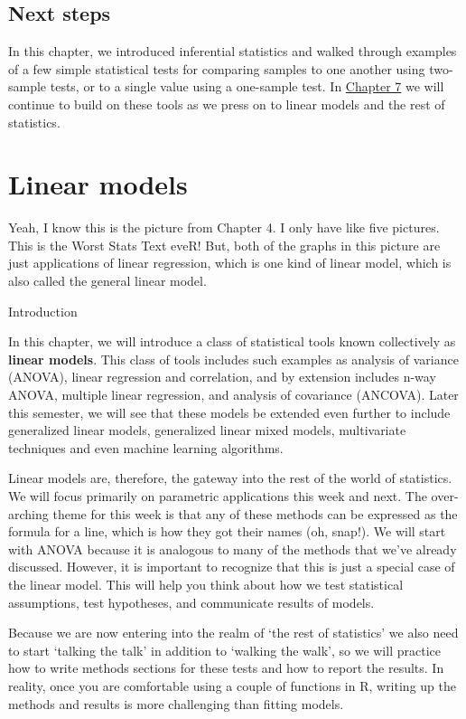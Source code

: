 \documentclass[
]{book}
\begin{document}
\hypertarget{next6}{%
\section{Next steps}\label{next6}}

In this chapter, we introduced inferential statistics and walked through examples of a few simple statistical tests for comparing samples to one another using two-sample tests, or to a single value using a one-sample test. In \protect\hyperlink{Chapter7}{Chapter 7} we will continue to build on these tools as we press on to linear models and the rest of statistics.

\hypertarget{Chapter7}{%
\chapter{Linear models}\label{Chapter7}}

Yeah, I know this is the picture from Chapter 4. I only have like five pictures. This is the Worst Stats Text eveR! But, both of the graphs in this picture are just applications of linear regression, which is one kind of linear model, which is also called the general linear model.

Introduction

In this chapter, we will introduce a class of statistical tools known collectively as \textbf{linear models}. This class of tools includes such examples as analysis of variance (ANOVA), linear regression and correlation, and by extension includes n-way ANOVA, multiple linear regression, and analysis of covariance (ANCOVA). Later this semester, we will see that these models be extended even further to include generalized linear models, generalized linear mixed models, multivariate techniques and even machine learning algorithms.

Linear models are, therefore, the gateway into the rest of the world of statistics. We will focus primarily on parametric applications this week and next. The over-arching theme for this week is that any of these methods can be expressed as the formula for a line, which is how they got their names (oh, snap!). We will start with ANOVA because it is analogous to many of the methods that we've already discussed. However, it is important to recognize that this is just a special case of the linear model. This will help you think about how we test statistical assumptions, test hypotheses, and communicate results of models.

Because we are now entering into the realm of `the rest of statistics' we also need to start `talking the talk' in addition to `walking the walk', so we will practice how to write methods sections for these tests and how to report the results. In reality, once you are comfortable using a couple of functions in R, writing up the methods and results is more challenging than fitting models.
\end{document}
